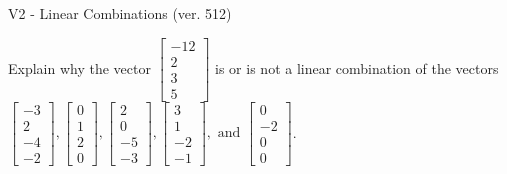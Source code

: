 \begin{exercise}
  \begin{exerciseTitle}V2 - Linear Combinations (ver. 512)\end{exerciseTitle}
  \begin{exerciseStatement}
    Explain why the vector \(\left[\begin{array}{c}
-12 \\
2 \\
3 \\
5
\end{array}\right]\)  is or is not a linear 
	combination of the vectors \(\left[\begin{array}{c}
-3 \\
2 \\
-4 \\
-2
\end{array}\right] , \left[\begin{array}{c}
0 \\
1 \\
2 \\
0
\end{array}\right] , \left[\begin{array}{c}
2 \\
0 \\
-5 \\
-3
\end{array}\right] , \left[\begin{array}{c}
3 \\
1 \\
-2 \\
-1
\end{array}\right] , \text{ and } \left[\begin{array}{c}
0 \\
-2 \\
0 \\
0
\end{array}\right]\).
	



\end{exerciseStatement}
\end{exercise}
